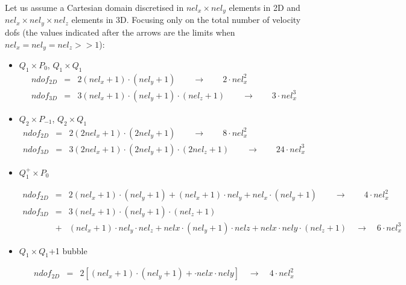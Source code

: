 Let us assume a Cartesian domain discretised in $nel_x \times nel_y$
elements in 2D and $nel_x \times nel_y \times nel_z$ elements in 3D.
Focusing only on the total number of velocity dofs (the values indicated after the 
arrows are the limits when $nel_x=nel_y=nel_z >> 1$):

\begin{itemize}

\item $Q_1 \times P_0$, $Q_1 \times Q_1$
\begin{eqnarray}
ndof_{2D}     &=&2 (nel_x+1) \cdot (nel_y+1) 
\qquad \rightarrow \qquad 2 \cdot nel_x^2   \nonumber\\
ndof_{3D}&=&3 (nel_x+1) \cdot (nel_y+1) \cdot (nel_z+1)
\qquad \rightarrow \qquad 3 \cdot nel_x^3 \nonumber
\end{eqnarray}

\item $Q_2 \times P_{-1}$, $Q_2 \times Q_1$
\begin{eqnarray}
ndof_{2D}      &=&2 (2nel_x+1) \cdot (2nel_y+1) 
\qquad \rightarrow \qquad 8 \cdot nel_x^2   \nonumber\\
ndof_{3D}&=&3 (2nel_x+1) \cdot (2nel_y+1) \cdot (2nel_z+1)
\qquad \rightarrow \qquad 24 \cdot nel_x^3 \nonumber
\end{eqnarray}


\item $Q_1^+ \times P_0$

\begin{eqnarray}
ndof_{2D}     &=&2 (nel_x+1) \cdot (nel_y+1) + (nel_x+1)\cdot nel_y + nel_x\cdot(nel_y+1)
\qquad \rightarrow \qquad 4 \cdot nel_x^2   \nonumber\\
ndof_{3D}&=&3 (nel_x+1) \cdot (nel_y+1) \cdot (nel_z+1) \nonumber\\
&+&  (nel_x+1)\cdot nel_y \cdot nel_z + nelx\cdot (nel_y+1) \cdot nelz + nelx\cdot nely \cdot (nel_z+1)
\quad \rightarrow \quad 6 \cdot nel_x^3 \nonumber
\end{eqnarray}

\item $Q_1 \times Q_1$+1 bubble

\begin{eqnarray}
ndof_{2D}&=& 2[(nel_x+1) \cdot (nel_y+1)  + \cdot nelx\cdot nely ]
\quad \rightarrow \quad 4 \cdot nel_x^2 \nonumber
\end{eqnarray}



\end{itemize}

